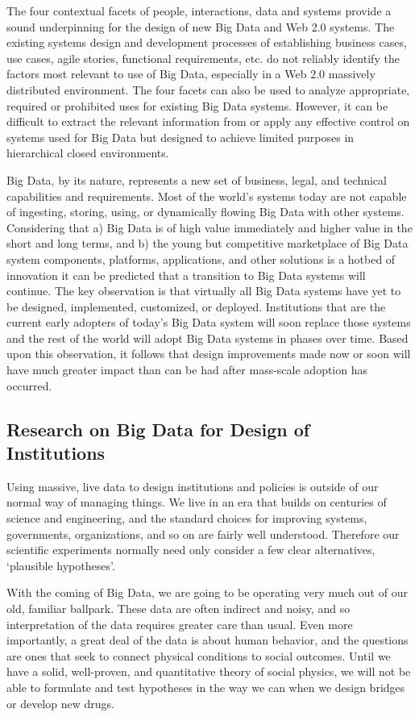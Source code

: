 The four contextual facets of people, interactions, data and systems provide a sound underpinning for the design of new Big Data and Web 2.0 systems.
The existing systems design and development processes of establishing business cases, use cases, agile stories, functional requirements, etc. do not reliably identify the factors most relevant to use of Big Data, especially in a Web 2.0 massively distributed environment.
The four facets can also be used to analyze appropriate, required or prohibited uses for existing Big Data systems.
However, it can be difficult to extract the relevant information from or apply any effective control on systems used for Big Data but designed to achieve limited purposes in hierarchical closed environments.

Big Data, by its nature, represents a new set of business, legal, and technical capabilities and requirements.
Most of the world's systems today are not capable of ingesting, storing, using, or dynamically flowing Big Data with other systems.
Considering that a) Big Data is of high value immediately and higher value in the short and long terms, and b) the young but competitive marketplace of Big Data system components, platforms, applications, and other solutions is a hotbed of innovation it can be predicted that a transition to Big Data systems will continue.
The key observation is that virtually all Big Data systems have yet to be designed, implemented, customized, or deployed.
Institutions that are the current early adopters of today’s Big Data system will soon replace those systems and the rest of the world will adopt Big Data systems in phases over time.
Based upon this observation, it follows that design improvements made now or soon will have much greater impact than can be had after mass-scale adoption has occurred.  

\subsection{Research on Big Data for Design of Institutions}

Using massive, live data to design institutions and policies is outside of our normal way of managing things.
We live in an era that builds on centuries of science and engineering, and the standard choices for improving systems, governments, organizations, and so on are fairly well understood. 
Therefore our scientific experiments normally need only consider a few clear alternatives, `plausible hypotheses'.

With the coming of Big Data, we are going to be operating very much out of our old, familiar ballpark.
These data are often indirect and noisy, and so interpretation of the data requires greater care than usual.
Even more importantly, a great deal of the data is about human behavior, and the questions are ones that seek to connect physical conditions to social outcomes.
Until we have a solid, well-proven, and quantitative theory of social physics, we will not be able to formulate and test hypotheses in the way we can when we design bridges or develop new drugs.

